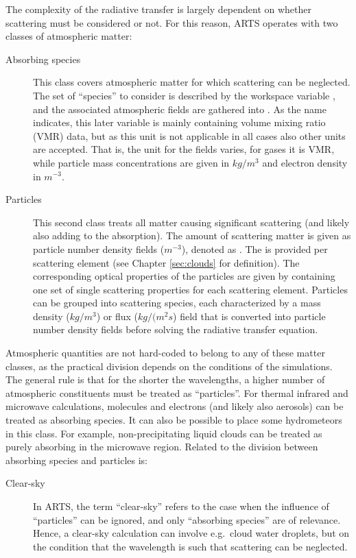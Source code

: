 The complexity of the radiative transfer is largely dependent on whether scattering
must be considered or not. For this reason, ARTS operates with two classes of
atmospheric matter:
\begin{description}
\item[Absorbing species] This class covers atmospheric matter for which
  scattering can be neglected. The set of ``species'' to consider is described
  by the workspace variable , and the associated
  atmospheric fields are gathered into . As the name
  indicates, this later variable is mainly containing volume mixing ratio (VMR)
  data, but as this unit is not applicable in all cases also other units are
  accepted. That is, the unit for the fields varies, for gases it is VMR, while
  particle mass concentrations are given in $kg/m^3$ and electron density in
  $m^{-3}$. 
\item[Particles] This second class treats all matter causing significant
  scattering (and likely also adding to the absorption). The amount of
  scattering matter is given as particle number density fields ($m^{-3}$),
  denoted as . The  is provided per
  scattering element (see Chapter \ref{sec:clouds} for definition). The
  corresponding optical properties of the particles are given by
   containing one set of single scattering properties
  for each scattering element. Particles can be grouped into scattering
  species, each characterized by a mass density ($kg/m^3$) or flux ($kg/(m^2s$)
  field that is converted into particle number density fields before solving the
  radiative transfer equation.
\end{description}
Atmospheric quantities are not hard-coded to belong to any of these matter
classes, as the practical division depends on the conditions of the
simulations. The general rule is that for the shorter the wavelengths, a higher
number of atmospheric constituents must be treated as ``particles''. For
thermal infrared and microwave calculations, molecules and electrons (and
likely also aerosols) can be treated as absorbing species. It can also be
possible to place some hydrometeors in this class. For example,
non-precipitating liquid clouds can be treated as purely absorbing in the
microwave region.
Related to the division between absorbing species and particles is:
\begin{description}
\item[Clear-sky] In ARTS, the term ``clear-sky'' refers to the case when the
  influence of ``particles'' can be ignored, and only ``absorbing species'' are
  of relevance. Hence, a clear-sky calculation can involve e.g.\ cloud water
  droplets, but on the condition that the wavelength is such that scattering
  can be neglected.
\end{description}

